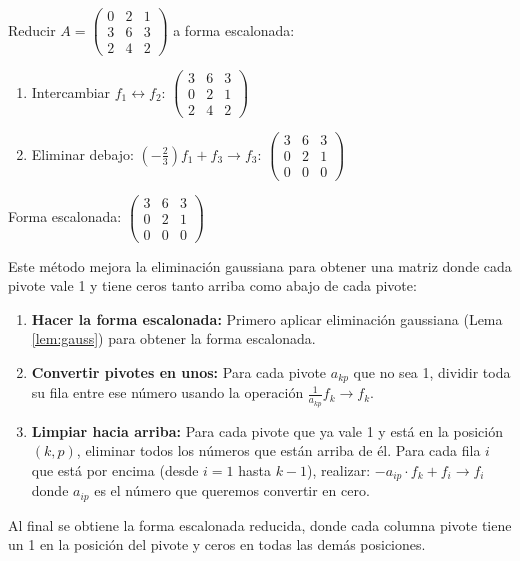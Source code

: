 \begin{example}
Reducir $A = \begin{pmatrix} 0 & 2 & 1 \\ 3 & 6 & 3 \\ 2 & 4 & 2 \end{pmatrix}$ a forma escalonada:
\begin{myproof}
\begin{enumerate}
\item Intercambiar $f_1 \leftrightarrow f_2$: $\begin{pmatrix} \boxed{3} & 6 & 3 \\ 0 & 2 & 1 \\ 2 & 4 & 2 \end{pmatrix}$
\item Eliminar debajo: $(-\frac{2}{3})f_1 + f_3 \to f_3$: $\begin{pmatrix} 3 & 6 & 3 \\ 0 & \boxed{2} & 1 \\ 0 & 0 & 0 \end{pmatrix}$
\end{enumerate}
Forma escalonada: $\begin{pmatrix} 3 & 6 & 3 \\ 0 & 2 & 1 \\ 0 & 0 & 0 \end{pmatrix}$
\end{myproof}
\end{example}

\begin{lemma}\label{lem:gauss-jordan}
Este método mejora la eliminación gaussiana para obtener una matriz donde cada pivote vale 1 y tiene ceros tanto arriba como abajo de cada pivote:

\begin{enumerate}
    \item \textbf{Hacer la forma escalonada:} Primero aplicar eliminación gaussiana (Lema \ref{lem:gauss}) para obtener la forma escalonada.
    
    \item \textbf{Convertir pivotes en unos:} Para cada pivote $a_{kp}$ que no sea 1, dividir toda su fila entre ese número usando la operación $\frac{1}{a_{kp}}f_k \to f_k$.
    
    \item \textbf{Limpiar hacia arriba:} Para cada pivote que ya vale 1 y está en la posición $(k,p)$, eliminar todos los números que están arriba de él. Para cada fila $i$ que está por encima (desde $i = 1$ hasta $k-1$), realizar:
    \( - a_{ip} \cdot f_k + f_i\to f_i
    \) donde $a_{ip}$ es el número que queremos convertir en cero.
\end{enumerate}

Al final se obtiene la forma escalonada reducida, donde cada columna pivote tiene un 1 en la posición del pivote y ceros en todas las demás posiciones.
\end{lemma}

